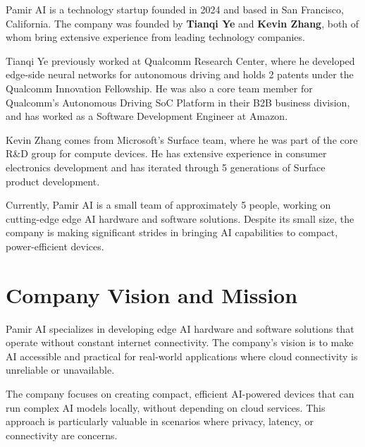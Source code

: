 \documentclass[12pt,a4paper]{report}
\begin{document}
Pamir AI is a technology startup founded in 2024 and based in San Francisco, California. The company was founded by \textbf{Tianqi Ye} and \textbf{Kevin Zhang}, both of whom bring extensive experience from leading technology companies.

\vspace{0.3cm}

Tianqi Ye previously worked at Qualcomm Research Center, where he developed edge-side neural networks for autonomous driving and holds 2 patents under the Qualcomm Innovation Fellowship. He was also a core team member for Qualcomm's Autonomous Driving SoC Platform in their B2B business division, and has worked as a Software Development Engineer at Amazon.

\vspace{0.3cm}

Kevin Zhang comes from Microsoft's Surface team, where he was part of the core R\&D group for compute devices. He has extensive experience in consumer electronics development and has iterated through 5 generations of Surface product development.

\vspace{0.3cm}

Currently, Pamir AI is a small team of approximately 5 people, working on cutting-edge edge AI hardware and software solutions. Despite its small size, the company is making significant strides in bringing AI capabilities to compact, power-efficient devices.


\section{Company Vision and Mission}

Pamir AI specializes in developing edge AI hardware and software solutions that operate without constant internet connectivity. The company's vision is to make AI accessible and practical for real-world applications where cloud connectivity is unreliable or unavailable.

\vspace{0.3cm}

The company focuses on creating compact, efficient AI-powered devices that can run complex AI models locally, without depending on cloud services. This approach is particularly valuable in scenarios where privacy, latency, or connectivity are concerns.
\end{document}
